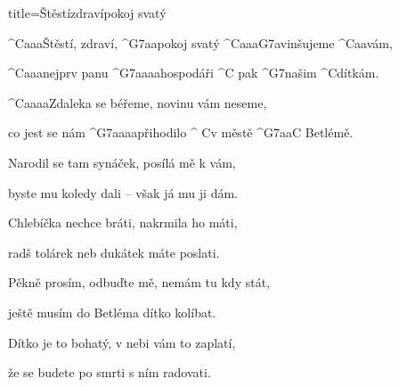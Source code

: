 \begin{song}{title=\predtitle\centering Štěstí\carka zdraví\carka  pokoj svatý \\\large \vspace*{-0.3cm}}  %
\begin{centerjustified}
\nejnejvetsi

\sloka
	^{C{\color{white}aaa}}Štěstí, zdraví, ^{G7{\color{white}aa}}pokoj svatý ^{C{\color{white}aaa}G7{\color{white}a}}vinšujeme ^{C{\color{white}aa}}vám,

	^{C{\color{white}aaa}}nejprv panu ^{G7{\color{white}aaaa}}hospodáři ^{C\,\,}pak ^{G7}našim ^{C}dítkám.

	^{C{\color{white}aaaa}}Zdaleka se béřeme, novinu vám neseme,

	co jest se nám ^{G7{\color{white}aaaa}}přihodilo ^{\,\,C}v městě ^{G7{\color{white}aa}C\,\,}Betlémě.

\sloka
	Narodil se tam synáček, posílá mě k vám,

	byste mu koledy dali -- však já mu ji dám.

	Chlebíčka nechce bráti, nakrmila ho máti,

	radš tolárek neb dukátek máte poslati.

\sloka

	Pěkně prosím, odbuďte mě, nemám tu kdy stát,

	ještě musím do Betléma dítko kolíbat.

	Dítko je to bohatý, v nebi vám to zaplatí,

	že se budete po smrti s ním radovati.

\end{centerjustified}
\setcounter{Slokočet}{0}
\end{song}

